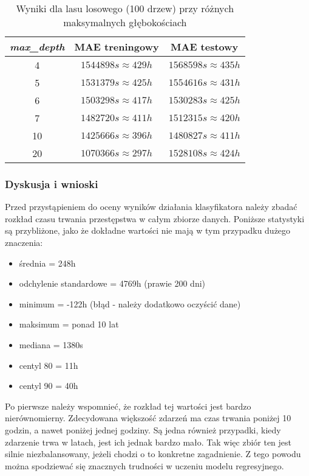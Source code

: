 \documentclass{classrep}
\begin{document}
{{{                \begin{table}
                    \centering
                    \begin{tabular}{|c|c|c|} \hline
                        \emph{max\_depth} & MAE treningowy & MAE testowy \\ \hline
                         4 & $1544898s \approx 429h$ & $1568598s \approx 435h$ \\
                         5 & $1531379s \approx 425h$ & $1554616s \approx 431h$ \\
                         6 & $1503298s \approx 417h$ & $1530283s \approx 425h$ \\
                         7 & $1482720s \approx 411h$ & $1512315s \approx 420h$ \\
                         10 & $1425666s \approx 396h$ & $1480827s \approx 411h$ \\
                         20 & $1070366s \approx 297h$ & $1528108s \approx 424h$ \\ \hline
                    \end{tabular}
                    \caption{Wyniki dla lasu losowego (100 drzew) przy różnych maksymalnych głębokościach}
                    \label{tab:tr_rf_max_depth}
                \end{table}
            }
            \subsubsection{Dyskusja i wnioski} {
                Przed przystąpieniem do oceny wyników działania klasyfikatora należy zbadać rozkład czasu trwania przestępstwa w całym zbiorze danych. Poniższe statystyki są przybliżone, jako że dokładne wartości nie mają w tym przypadku dużego znaczenia:
                \begin{itemize}
                    \item średnia = 248h
                    \item odchylenie standardowe = 4769h (prawie 200 dni)
                    \item minimum = -122h (błąd - należy dodatkowo oczyścić dane)
                    \item maksimum = ponad 10 lat
                    \item mediana = 1380s
                    \item centyl 80 = 11h
                    \item centyl 90 = 40h
                \end{itemize}
                Po pierwsze należy wspomnieć, że rozkład tej wartości jest bardzo nierównomierny. Zdecydowana większość zdarzeń ma czas trwania poniżej 10 godzin, a nawet poniżej jednej godziny. Są jedna również przypadki, kiedy zdarzenie trwa w latach, jest ich jednak bardzo mało. Tak więc zbiór ten jest silnie niezbalansowany, jeżeli chodzi o to konkretne zagadnienie. Z tego powodu można spodziewać się znacznych trudności w uczeniu modelu regresyjnego.
                
}}}
\end{document}

